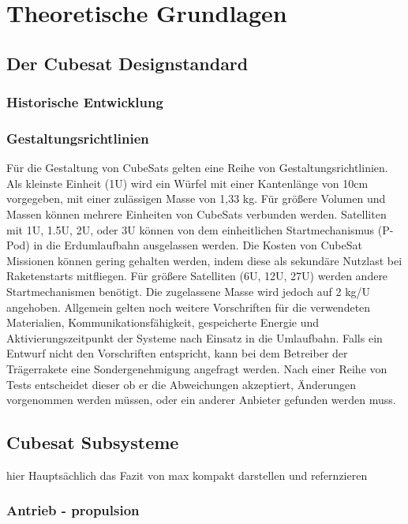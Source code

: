 \chapter{Theoretische Grundlagen}
\section{Der Cubesat Designstandard}
	\subsection{Historische Entwicklung}
	\subsection{Gestaltungsrichtlinien}
	
	
	\begin{flushleft}
Für die Gestaltung von CubeSats gelten eine Reihe von Gestaltungsrichtlinien. Als kleinste Einheit (1U) wird ein Würfel mit einer Kantenlänge von 10cm vorgegeben, mit einer zulässigen Masse von 1,33 kg. Für größere Volumen und Massen können mehrere Einheiten von CubeSats verbunden werden. Satelliten mit 1U, 1.5U, 2U, oder 3U können von dem einheitlichen Startmechanismus (P-Pod) in die Erdumlaufbahn ausgelassen werden. Die Kosten von CubeSat Missionen können gering gehalten werden, indem diese als sekundäre Nutzlast bei Raketenstarts mitfliegen. Für größere Satelliten (6U, 12U, 27U) werden andere Startmechanismen benötigt. Die zugelassene Masse wird jedoch auf 2 kg/U angehoben. Allgemein gelten noch weitere Vorschriften für die verwendeten  Materialien, Kommunikationsfähigkeit, gespeicherte Energie und Aktivierungszeitpunkt der Systeme nach Einsatz in die Umlaufbahn.
Falls ein Entwurf nicht den Vorschriften entspricht, kann bei dem Betreiber der Trägerrakete eine Sondergenehmigung angefragt werden. Nach einer Reihe von Tests entscheidet dieser ob er die Abweichungen akzeptiert, Änderungen vorgenommen werden müssen, oder ein anderer Anbieter gefunden werden muss. 
	\end{flushleft}

			
	\section{Cubesat Subsysteme}
	hier Hauptsächlich das Fazit von max kompakt darstellen und refernzieren
		\subsection{Antrieb - propulsion}

